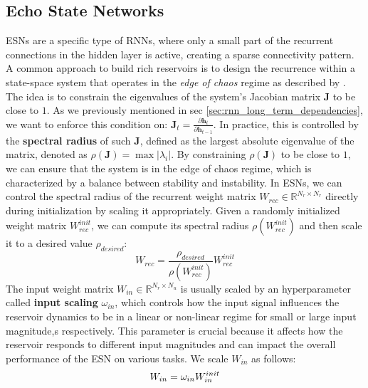 \subsection{Echo State Networks}
\label{sec:esn}
ESNs are a specific type of RNNs, where only a small part of the recurrent connections in the hidden layer is active, creating a sparse connectivity pattern.
A common approach to build rich reservoirs \cite[Ch 10.8]{lecun2015deep} is to design the recurrence within a state-space system that operates in the \textit{edge of chaos} regime as described by \cite{NIPS2004_f8da71e5} \cite{LANGTON1986120}.
 The idea is to constrain the eigenvalues of the system's Jacobian matrix $\mathbf{J}$ to be close to $1$. As we previously mentioned in sec \ref{sec:rnn_long_term_dependencies},
 we want to enforce this condition on: $\mathbf{J}_t = \frac{\partial \mathbf{h}_{t}}{\partial \mathbf{h}_{t-1}}$.
 \newline
 In practice, this is controlled by the \textbf{spectral radius} of such $\mathbf{J}$, defined as the largest absolute eigenvalue of the matrix, denoted as $\rho(\mathbf{J}) = \max{|\lambda_i|}$.
 By constraining $\rho(\mathbf{J})$ to be close to $1$, we can ensure that the system is in the edge of chaos regime, which is characterized by a balance between stability and instability.
 \newline
 In ESNs, we can control the spectral radius of the recurrent weight matrix $W_{rec} \in \mathbb{R}^{N_r \times N_r}$ directly during initialization by scaling it appropriately.
 Given a randomly initialized weight matrix $W_{rec}^{init}$, we can compute its spectral radius $\rho(W_{rec}^{init})$ and then scale it to a desired value $\rho_{desired}$:
 \begin{equation}
    W_{rec} = \frac{\rho_{desired}}{\rho(W_{rec}^{init})} W_{rec}^{init}
 \end{equation}
The input weight matrix $W_{in} \in \mathbb{R}^{N_r \times N_u}$ is usually scaled by an hyperparameter called \textbf{input scaling} $\omega_{in}$, 
which controls how the input signal influences the reservoir dynamics to be in a linear or non-linear regime for small or large input magnitude,s respectively.
This parameter is crucial because it affects how the reservoir responds to different input magnitudes and can impact the overall performance of the ESN on various tasks.
We scale $W_{in}$ as follows:
\begin{equation}
    W_{in} = \omega_{in} W_{in}^{init} \\
\end{equation}

